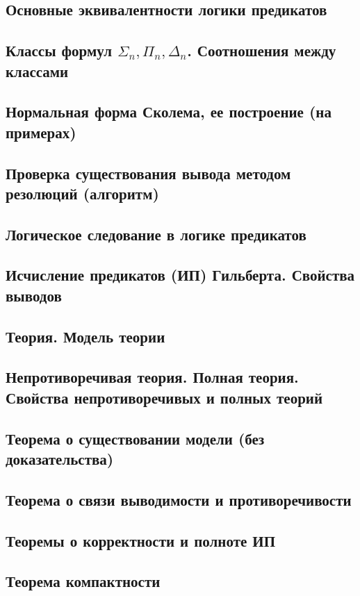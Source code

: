 \documentclass[a4paper]{article}
\theoremstyle{definition}
\theoremstyle{remark}
\begin{document}
    \subsection{Основные эквивалентности логики предикатов}
    \subsection{Классы формул $\Sigma_n, \Pi_n, \Delta_n$. Соотношения между классами}
    \subsection{Нормальная форма Сколема, ее построение (на примерах)}
    \subsection{Проверка существования вывода методом резолюций (алгоритм)}
    \subsection{Логическое следование в логике предикатов}
    \subsection{Исчисление предикатов (ИП)  Гильберта. Свойства выводов}
    \subsection{Теория. Модель теории}
    \subsection{Непротиворечивая теория. Полная теория. Свойства непротиворечивых и полных теорий}
    \subsection{Теорема о существовании модели (без доказательства)}
    \subsection{Теорема о связи выводимости и противоречивости}
    \subsection{Теоремы о корректности и полноте ИП}
    \subsection{Теорема компактности}
\end{document}
